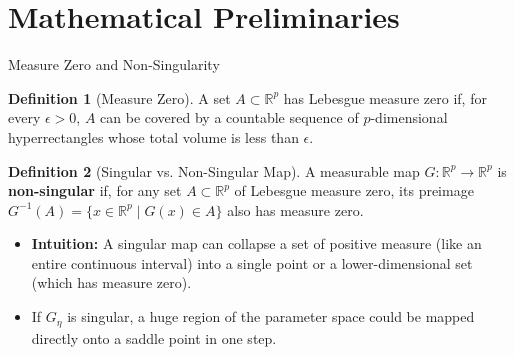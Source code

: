 \documentclass[10pt, aspectratio=169]{beamer}
\theoremstyle{definition}
\newtheorem{defn}{Definition}
\begin{document}

\section{Mathematical Preliminaries}

\begin{frame}{Measure Zero and Non-Singularity}
    \begin{defn}[Measure Zero]
        A set $A \subset \mathbb{R}^p$ has Lebesgue measure zero if, for every $\epsilon > 0$, $A$ can be covered by a countable sequence of $p$-dimensional hyperrectangles whose total volume is less than $\epsilon$.
    \end{defn}
    \begin{defn}[Singular vs. Non-Singular Map]
        A measurable map $G: \mathbb{R}^p \to \mathbb{R}^p$ is \textbf{non-singular} if, for any set $A \subset \mathbb{R}^p$ of Lebesgue measure zero, its preimage $G^{-1}(A) = \{x \in \mathbb{R}^p \mid G(x) \in A\}$ also has measure zero.
    \end{defn}
    \begin{itemize}
        \item \textbf{Intuition:} A singular map can collapse a set of positive measure (like an entire continuous interval) into a single point or a lower-dimensional set (which has measure zero).
        \item If $G_\eta$ is singular, a huge region of the parameter space could be mapped directly onto a saddle point in one step.
    \end{itemize}
\end{frame}
\end{document}
